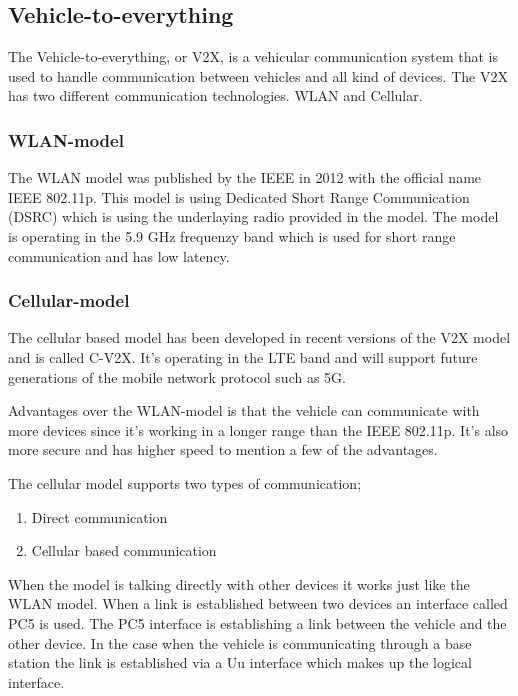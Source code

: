\subsection{Vehicle-to-everything} \label{v2xSec}
The Vehicle-to-everything, or V2X, is a vehicular communication system that is used to handle communication between vehicles and all kind of devices.
The V2X has two different communication technologies. WLAN and Cellular. 

\subsubsection{WLAN-model} \label{v2iWlanMod}

The WLAN model was published by the IEEE in 2012 with the official name IEEE 802.11p. This model is using Dedicated Short Range Communication (DSRC) which is using the underlaying radio provided in the model. The model is operating in the 5.9 GHz frequenzy band which is used for short range communication and has low latency. \cite{dsrc}

\subsubsection{Cellular-model} \label{v2iCellMod}

The cellular based model has been developed in recent versions of the V2X model and is called C-V2X. It's operating in the LTE band and will support future generations of the mobile network protocol such as 5G. \cite{gsma}

\bigskip

Advantages over the WLAN-model is that the vehicle can communicate with more devices since it's working in a longer range than the IEEE 802.11p. It's also more secure and has higher speed to mention a few of the advantages. \cite{gsma}

\bigskip

The cellular model supports two types of communication;

\begin{enumerate}
    \item Direct communication
    \item Cellular based communication
\end{enumerate}

When the model is talking directly with other devices it works just like the WLAN model. When a link is established between two devices an interface called PC5 is used. The PC5 interface is establishing a link between the vehicle and the other device.
In the case when the vehicle is communicating through a base station the link is established via a Uu interface which makes up the logical interface.